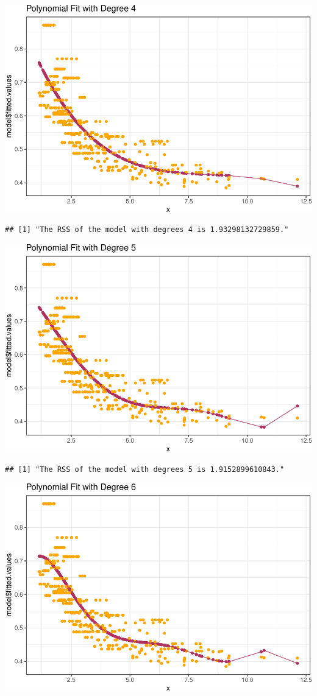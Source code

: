 \documentclass[]{article}
\begin{document}
\includegraphics{hw7_files/figure-latex/unnamed-chunk-6-4.pdf}

\begin{verbatim}
## [1] "The RSS of the model with degrees 4 is 1.93298132729859."
\end{verbatim}

\includegraphics{hw7_files/figure-latex/unnamed-chunk-6-5.pdf}

\begin{verbatim}
## [1] "The RSS of the model with degrees 5 is 1.9152899610843."
\end{verbatim}

\includegraphics{hw7_files/figure-latex/unnamed-chunk-6-6.pdf}
\end{document}
